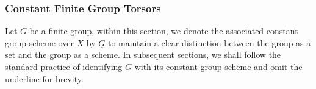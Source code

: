 






\subsubsection*{Constant Finite Group Torsors}

Let $G$ be a finite group, within this section, we denote the associated constant group scheme over $X$ by $\underline{G}$ to maintain a clear distinction between the group as a set and the group as a scheme. In subsequent sections, we shall follow the standard practice of identifying $G$ with its constant group scheme and omit the underline for brevity.

